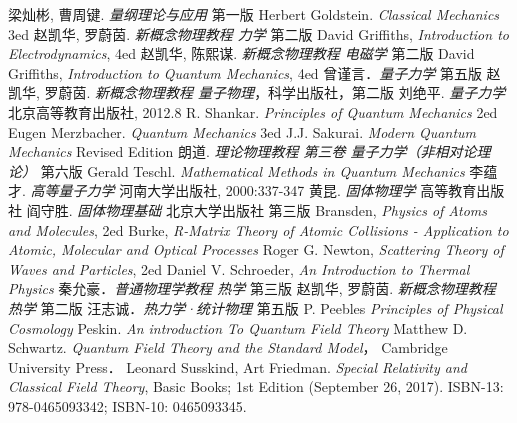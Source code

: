 \begin{thebibliography}{99}
梁灿彬, 曹周键. \textsl{量纲理论与应用} 第一版
Herbert Goldstein. \textsl{Classical Mechanics} 3ed
赵凯华, 罗蔚茵. \textsl{新概念物理教程 力学} 第二版
David Griffiths, \textsl{Introduction to Electrodynamics}, 4ed
赵凯华, 陈熙谋. \textsl{新概念物理教程 电磁学} 第二版
David Griffiths, \textsl{Introduction to Quantum Mechanics}, 4ed
曾谨言．\textsl{量子力学} 第五版
赵凯华, 罗蔚茵. \textsl{新概念物理教程 量子物理}，科学出版社，第二版
刘绝平. \textsl{量子力学} 北京高等教育出版社, 2012.8
R. Shankar. \textsl{Principles of Quantum Mechanics} 2ed
Eugen Merzbacher. \textsl{Quantum  Mechanics} 3ed
J.J. Sakurai. \textsl{Modern Quantum Mechanics} Revised Edition
朗道. \textsl{理论物理教程 第三卷 量子力学（非相对论理论）} 第六版
Gerald Teschl. \textsl{Mathematical Methods in Quantum Mechanics}
李蕴才. \textsl{高等量子力学} 河南大学出版社, 2000:337-347
黄昆. \textsl{固体物理学} 高等教育出版社
阎守胜. \textsl{固体物理基础} 北京大学出版社 第三版
Bransden, \textsl{Physics of Atoms and Molecules}, 2ed
Burke, \textsl{R-Matrix Theory of Atomic Collisions - Application to Atomic, Molecular and Optical Processes}
Roger G. Newton, \textsl{Scattering Theory of Waves and Particles}, 2ed
Daniel V. Schroeder, \textsl{An Introduction to Thermal Physics}
秦允豪．\textsl{普通物理学教程 热学} 第三版
赵凯华, 罗蔚茵. \textsl{新概念物理教程 热学} 第二版
汪志诚．\textsl{热力学·统计物理}  第五版
P. Peebles \textsl{Principles of Physical Cosmology}
Peskin. \textsl{An introduction To Quantum Field Theory}
Matthew D. Schwartz. \textsl{Quantum Field Theory and the Standard Model}， Cambridge University Press．
Leonard Susskind, Art Friedman. \textsl{Special Relativity and Classical Field Theory}, Basic Books; 1st Edition (September 26, 2017). ISBN-13: 978-0465093342; ISBN-10: 0465093345. 

\end{thebibliography}
